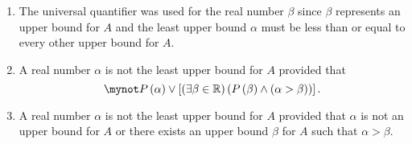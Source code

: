 \documentclass[11pt]{article}
\begin{document}
\begin{enumerate}
\item The universal quantifier was used for the real number  $\beta $
  since  $\beta $  represents an upper bound for  $A$  and the least upper bound  $\alpha $
 must be less than or equal to every other upper bound for  $A$.


\item A real number  $\alpha $ is not the least upper bound for  $A$  provided that  
\[
\mynot P\left( \alpha  \right) \vee \left[ {\left( {\exists \beta  \in \mathbb{R}} \right)\left( {P\left( \beta  \right) \wedge \left( {\alpha  > \beta } \right)} \right)} \right].
\]

\item A real number  $\alpha $ is not the least upper bound for  $A$  provided that  $\alpha $ is not an upper bound for  $A$  or there exists an upper bound  $\beta $  for  $A$  such that  $\alpha  > \beta $.
\end{enumerate}
\end{document}
